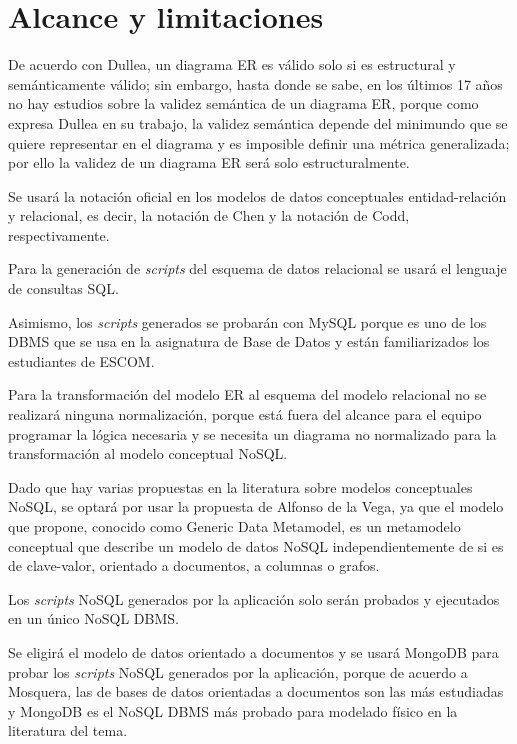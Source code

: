\section{Alcance y limitaciones}

De acuerdo con Dullea\cite{dullea_analysis_2003}, un diagrama ER es válido solo si es estructural y semánticamente válido; sin embargo, hasta donde se sabe, en los últimos 17 años no hay estudios sobre la validez semántica de un diagrama ER, porque como expresa Dullea en su trabajo, la validez semántica depende del minimundo que se quiere representar en el diagrama y es imposible definir una métrica generalizada; por ello la validez de un diagrama ER será solo estructuralmente.


Se usará la notación oficial en los modelos de datos conceptuales entidad-relación y relacional, es decir, la notación de Chen y la notación de Codd, respectivamente.


Para la generación de \textit{scripts} del esquema de datos relacional se usará el lenguaje de consultas SQL.


Asimismo, los \textit{scripts} generados se probarán con MySQL porque es uno de los DBMS que se usa en la asignatura de Base de Datos y están familiarizados los estudiantes de ESCOM.


Para la transformación del modelo ER al esquema del modelo relacional no se realizará ninguna normalización, porque está fuera del alcance para el equipo programar la lógica necesaria y se necesita un diagrama no normalizado para la transformación al modelo conceptual NoSQL.


Dado que hay varias propuestas en la literatura sobre modelos conceptuales NoSQL, se optará por usar la propuesta de Alfonso de la Vega\cite{de_la_vega_mortadelo_2020}, ya que el modelo que propone, conocido como Generic Data Metamodel, es un metamodelo conceptual que describe un modelo de datos NoSQL independientemente de si es de clave-valor, orientado a documentos, a columnas o grafos.


Los \textit{scripts} NoSQL generados por la aplicación solo serán probados y ejecutados en un único NoSQL DBMS.


Se eligirá el modelo de datos orientado a documentos y se usará MongoDB para probar los \textit{scripts} NoSQL generados por la aplicación, porque de acuerdo a Mosquera\cite{martinez-mosquera_modeling_2020}, las de bases de datos orientadas a documentos son las más estudiadas y MongoDB es el NoSQL DBMS más probado para modelado físico en la literatura del tema.


